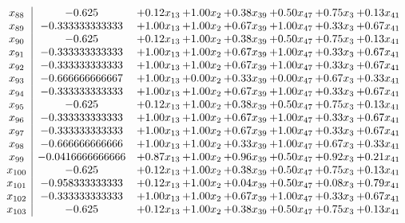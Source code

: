 \documentclass[8pt]{article}
\begin{document}
\[\begin{array}{c| c c@{\hskip 2pt} c@{\hskip 2pt} c@{\hskip 2pt} c@{\hskip 2pt} c@{\hskip 2pt} c@{\hskip 2pt} }
 x_{88}   &  -0.625 & +  0.12 x_{13} & +  1.00 x_{2} & +  0.38 x_{39} & +  0.50 x_{47} & +  0.75 x_{3} & +  0.13 x_{41}\\
 x_{89}   &  -0.333333333333 & +  1.00 x_{13} & +  1.00 x_{2} & +  0.67 x_{39} & +  1.00 x_{47} & +  0.33 x_{3} & +  0.67 x_{41}\\
 x_{90}   &  -0.625 & +  0.12 x_{13} & +  1.00 x_{2} & +  0.38 x_{39} & +  0.50 x_{47} & +  0.75 x_{3} & +  0.13 x_{41}\\
 x_{91}   &  -0.333333333333 & +  1.00 x_{13} & +  1.00 x_{2} & +  0.67 x_{39} & +  1.00 x_{47} & +  0.33 x_{3} & +  0.67 x_{41}\\
 x_{92}   &  -0.333333333333 & +  1.00 x_{13} & +  1.00 x_{2} & +  0.67 x_{39} & +  1.00 x_{47} & +  0.33 x_{3} & +  0.67 x_{41}\\
 x_{93}   &  -0.666666666667 & +  1.00 x_{13} & +  0.00 x_{2} & +  0.33 x_{39} & +  0.00 x_{47} & +  0.67 x_{3} & +  0.33 x_{41}\\
 x_{94}   &  -0.333333333333 & +  1.00 x_{13} & +  1.00 x_{2} & +  0.67 x_{39} & +  1.00 x_{47} & +  0.33 x_{3} & +  0.67 x_{41}\\
 x_{95}   &  -0.625 & +  0.12 x_{13} & +  1.00 x_{2} & +  0.38 x_{39} & +  0.50 x_{47} & +  0.75 x_{3} & +  0.13 x_{41}\\
 x_{96}   &  -0.333333333333 & +  1.00 x_{13} & +  1.00 x_{2} & +  0.67 x_{39} & +  1.00 x_{47} & +  0.33 x_{3} & +  0.67 x_{41}\\
 x_{97}   &  -0.333333333333 & +  1.00 x_{13} & +  1.00 x_{2} & +  0.67 x_{39} & +  1.00 x_{47} & +  0.33 x_{3} & +  0.67 x_{41}\\
 x_{98}   &  -0.666666666666 & +  1.00 x_{13} & +  1.00 x_{2} & +  0.33 x_{39} & +  1.00 x_{47} & +  0.67 x_{3} & +  0.33 x_{41}\\
 x_{99}   &  -0.0416666666666 & +  0.87 x_{13} & +  1.00 x_{2} & +  0.96 x_{39} & +  0.50 x_{47} & +  0.92 x_{3} & +  0.21 x_{41}\\
 x_{100}   &  -0.625 & +  0.12 x_{13} & +  1.00 x_{2} & +  0.38 x_{39} & +  0.50 x_{47} & +  0.75 x_{3} & +  0.13 x_{41}\\
 x_{101}   &  -0.958333333333 & +  0.12 x_{13} & +  1.00 x_{2} & +  0.04 x_{39} & +  0.50 x_{47} & +  0.08 x_{3} & +  0.79 x_{41}\\
 x_{102}   &  -0.333333333333 & +  1.00 x_{13} & +  1.00 x_{2} & +  0.67 x_{39} & +  1.00 x_{47} & +  0.33 x_{3} & +  0.67 x_{41}\\
 x_{103}   &  -0.625 & +  0.12 x_{13} & +  1.00 x_{2} & +  0.38 x_{39} & +  0.50 x_{47} & +  0.75 x_{3} & +  0.13 x_{41}\\

\end{array}\]
\end{document}
